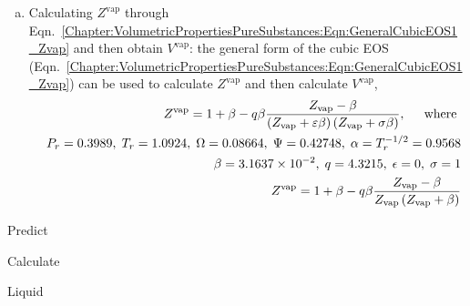 \begin{probsol}
\begin{enumerate}[1.]
\begin{enumerate}[a)]
               \item Calculating $Z^{\text{vap}}$ through Eqn.~\ref{Chapter:VolumetricPropertiesPureSubstances:Eqn:GeneralCubicEOS1_Zvap} and then obtain $V^{\text{vap}}$: the general form of the cubic EOS (Eqn.~\ref{Chapter:VolumetricPropertiesPureSubstances:Eqn:GeneralCubicEOS1_Zvap}) can be used to calculate $Z^{\text{vap}}$ and then calculate $V^{\text{vap}}$, 
                   \begin{eqnarray}
                      && Z^{\text{vap}} = 1 + \beta - q\beta \displaystyle\frac{Z_{\text{vap}} - \beta} {\left(Z_{\text{vap}}+\varepsilon\beta\right)\left(Z_{\text{vap}} +\sigma\beta\right)},\;\;\;\;\text{ where } \nonumber \\
                      && P_{r} = 0.3989,\; T_{r}=1.0924,\; \Omega=0.08664,\; \Psi = 0.42748,\; \alpha=T_{r}^{-1/2}=0.9568 \nonumber  \\
                      && \beta = 3.1637\times 10^{-2},\; q=4.3215,\; \epsilon =0,\; \sigma=1 \nonumber \\
                      && Z^{\text{vap}} = 1 + \beta - q\beta \displaystyle\frac{Z_{\text{vap}} - \beta} {Z_{\text{vap}}\left(Z_{\text{vap}}+\beta\right)} \nonumber
                   \end{eqnarray}
            \end{enumerate}
%
     \end{enumerate}


  \end{probsol}
%
  \begin{probsol}\label{Chapter:VolumetricPropertiesPureSubstances:Problem:02:solution}
     Predict 
  \end{probsol}
%
  \begin{probsol}\label{Chapter:VolumetricPropertiesPureSubstances:Problem:03:solution}
     Calculate
  \end{probsol}
%
  \begin{probsol}\label{Chapter:VolumetricPropertiesPureSubstances:Problem:04:solution} 
     Liquid 
  \end{probsol}
%
